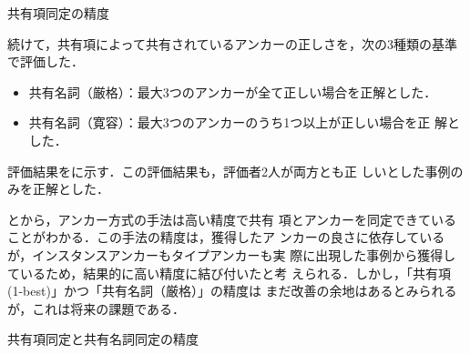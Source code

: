 \documentclass[japanese]{jnlp_1.4}
\begin{document}
\begin{table}[b]
  \caption{共有項同定の精度}
    \label{tab:arg-prec}

\end{table}

続けて，共有項によって共有されているアンカーの正しさを，次の3種類の基準
で評価した．
\begin{itemize}
\item 共有名詞（厳格）：最大3つのアンカーが全て正しい場合を正解とした．
\item 共有名詞（寛容）：最大3つのアンカーのうち1つ以上が正しい場合を正
  解とした．
\end{itemize}
評価結果をに示す．この評価結果も，評価者2人が両方とも正
しいとした事例のみを正解とした．

とから，アンカー方式の手法は高い精度で共有
項とアンカーを同定できていることがわかる．この手法の精度は，獲得したア
ンカーの良さに依存しているが，インスタンスアンカーもタイプアンカーも実
際に出現した事例から獲得しているため，結果的に高い精度に結び付いたと考
えられる．しかし，「共有項 (1-best)」かつ「共有名詞（厳格）」の精度は
まだ改善の余地はあるとみられるが，これは将来の課題である．

\begin{table}[t]
  \caption{共有項同定と共有名詞同定の精度}
    \label{tab:noun-prec}

\end{table}
\end{document}
